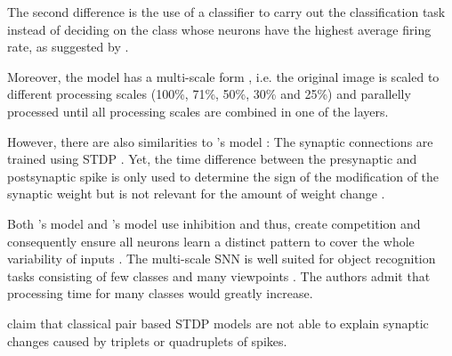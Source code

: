 The second difference is the use of a classifier to carry out the classification task 
instead of deciding on the class whose neurons have the highest average firing rate, 
as suggested by \authorsSNN{} \cite{SNN}.

Moreover, the model has a multi-scale form \cite{multi_scale_STDP}, i.e. the original image is scaled to different processing scales 
(100\%, 71\%, 50\%, 30\% and 25\%) and parallelly processed until 
all processing scales are combined in one of the layers.

However, there are also similarities to \authorsSNN{}'s model \cite{SNN}:
The synaptic connections are trained using \ac{STDP} \cite{multi_scale_STDP,STDP_vis_feat}.
Yet, the time difference between the presynaptic and postsynaptic spike is only used to determine the sign of the modification of the synaptic weight 
but is not relevant for the amount of weight change \cite{STDP_vis_feat}.

Both \authorsmultiScaleSTDP{}'s model \cite{multi_scale_STDP} and \authorsSNN{}'s model \cite{SNN} use inhibition and thus, 
create competition and consequently ensure all neurons learn a distinct pattern to cover the whole variability of inputs \cite{STDP_vis_feat}.
%
%
%
The multi-scale \ac{SNN} is well suited for object recognition tasks consisting of few classes and many viewpoints \cite{multi_scale_STDP}.
The authors admit that processing time for many classes would greatly increase.

\authorsSTDPtriplet{} \cite{STDP_triplet} claim that classical pair based \ac{STDP} models 
are not able to explain synaptic changes caused by triplets or quadruplets of spikes.